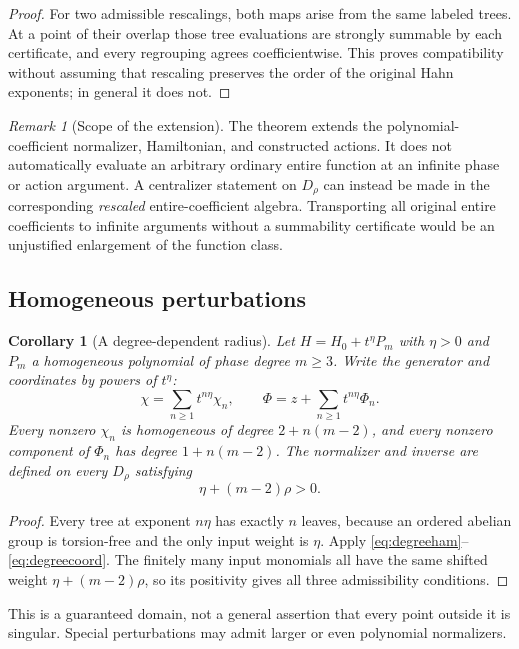 \documentclass[11pt,letterpaper]{article}
\numberwithin{equation}{section}
\newtheorem{corollary}[theorem]{Corollary}
\theoremstyle{definition}
\theoremstyle{remark}
\newtheorem{remark}[theorem]{Remark}
\begin{document}
\begin{proof}
For two admissible rescalings, both maps arise from the same labeled trees.
At a point of their overlap those tree evaluations are strongly summable
by each certificate, and every regrouping agrees coefficientwise. This
proves compatibility without assuming that rescaling preserves the order
of the original Hahn exponents; in general it does not.
\end{proof}

\begin{remark}[Scope of the extension]
The theorem extends the polynomial-coefficient normalizer, Hamiltonian,
and constructed actions. It does not automatically evaluate an arbitrary
ordinary entire function at an infinite phase or action argument. A
centralizer statement on $D_\rho$ can instead be made in the corresponding
\emph{rescaled} entire-coefficient algebra. Transporting all original
entire coefficients to infinite arguments without a summability certificate
would be an unjustified enlargement of the function class.
\end{remark}

\subsection{Homogeneous perturbations}
\begin{corollary}[A degree-dependent radius]\label{cor:homogeneous}
Let $H=H_0+t^\eta P_m$ with $\eta>0$ and $P_m$ a homogeneous polynomial of
phase degree $m\ge3$. Write the generator and coordinates by powers of
$t^\eta$:
\[
 \chi=\sum_{n\ge1}t^{n\eta}\chi_n,\qquad
 \Phi=z+\sum_{n\ge1}t^{n\eta}\Phi_n.
\]
Every nonzero $\chi_n$ is homogeneous of degree $2+n(m-2)$, and every
nonzero component of $\Phi_n$ has degree $1+n(m-2)$. The normalizer and
inverse are defined on every $D_\rho$ satisfying
\begin{equation}\label{eq:homogeneousdomain}
 \eta+(m-2)\rho>0.
\end{equation}
\end{corollary}
\begin{proof}
Every tree at exponent $n\eta$ has exactly $n$ leaves, because an ordered
abelian group is torsion-free and the only input weight is $\eta$. Apply
\eqref{eq:degreeham}--\eqref{eq:degreecoord}. The finitely many input
monomials all have the same shifted weight
$\eta+(m-2)\rho$, so its positivity gives all three admissibility
conditions.
\end{proof}
This is a guaranteed domain, not a general assertion that every point
outside it is singular. Special perturbations may admit larger or even
polynomial normalizers.
\end{document}
